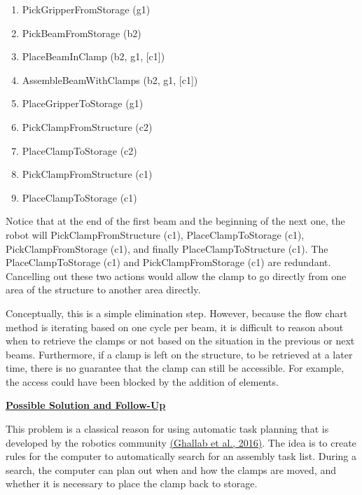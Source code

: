 \begin{enumerate}
\begin{enumerate}
	\item {\footnotesize PickGripperFromStorage (g1)}

	\item {\footnotesize PickBeamFromStorage (b2)}

	\item {\footnotesize PlaceBeamInClamp (b2, g1, [c1])}

	\item {\footnotesize AssembleBeamWithClamps (b2, g1, [c1])}

	\item {\footnotesize PlaceGripperToStorage (g1)}

	\item {\footnotesize PickClampFromStructure (c2)}

	\item {\footnotesize PlaceClampToStorage (c2)}

	\item {\footnotesize PickClampFromStructure (c1)}

	\item {\footnotesize PlaceClampToStorage (c1)}

\end{enumerate}
\end{enumerate}
Notice that at the end of the first beam and the beginning of the next one, the robot will PickClampFromStructure (c1), PlaceClampToStorage (c1), PickClampFromStorage (c1), and finally PlaceClampToStructure (c1). The PlaceClampToStorage (c1) and PickClampFromStorage (c1) are redundant. Cancelling out these two actions would allow the clamp to go directly from one area of the structure to another area directly.

Conceptually, this is a simple elimination step. However, because the flow chart method is iterating based on one cycle per beam, it is difficult to reason about when to retrieve the clamps or not based on the situation in the previous or next beams. Furthermore, if a clamp is left on the structure, to be retrieved at a later time, there is no guarantee that the clamp can still be accessible. For example, the access could have been blocked by the addition of elements. 

\textbf{\uline{Possible Solution and Follow-Up}}

This problem is a classical reason for using automatic task planning that is developed by the robotics community \href{https://www.zotero.org/google-docs/?DFFCVl}{(Ghallab et al., 2016)}. The idea is to create rules for the computer to automatically search for an assembly task list. During a search, the computer can plan out when and how the clamps are moved, and whether it is necessary to place the clamp back to storage. 

